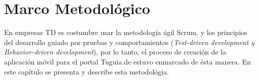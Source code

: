 \chapter{Marco Metodológico} \label{chap:marco_metodologico}

\vspace{5 mm}

En empresas TD es costumbre usar la metodología ágil Scrum, y los principios del desarrollo guiado por pruebas y comportamientos (\textit{Test-driven development y Behavior-driven development}), por lo tanto, el proceso de creación de la aplicación móvil para el portal Tuguia.de estuvo enmarcado de ésta manera. En este capítulo se presenta y describe esta metodológia.